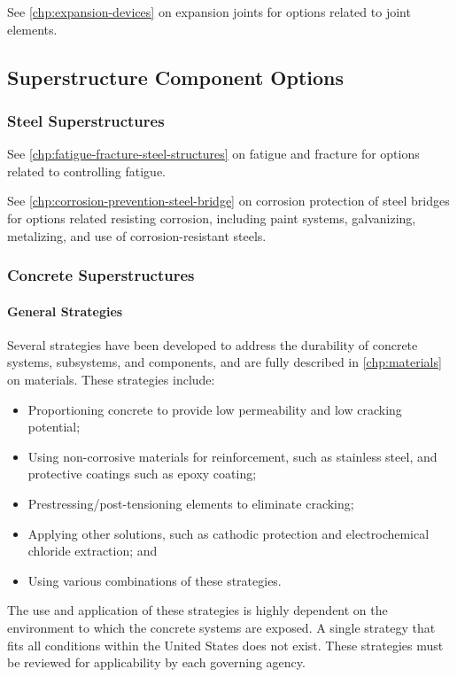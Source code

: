 See \cref{chp:expansion-devices} on expansion joints for options related to joint elements.

\subsection{Superstructure Component Options}
\subsubsection{Steel Superstructures}
See \cref{chp:fatigue-fracture-steel-structures} on fatigue and fracture for options related to controlling fatigue.

See \cref{chp:corrosion-prevention-steel-bridge} on corrosion protection of steel bridges for options related resisting corrosion, including paint systems, galvanizing, metalizing, and use of corrosion-resistant steels.

\subsubsection{Concrete Superstructures}
\paragraph{General Strategies}
Several strategies have been developed to address the durability of concrete systems, subsystems, and
components, and are fully described in \cref{chp:materials} on materials. These strategies include:
\begin{itemize}
  \item Proportioning concrete to provide low permeability and low cracking potential;
  \item Using non-corrosive materials for reinforcement, such as stainless steel, and protective coatings such as
  epoxy coating;
  \item  Prestressing/post-tensioning elements to eliminate cracking;
  \item Applying other solutions, such as cathodic protection and electrochemical chloride extraction; and
  \item Using various combinations of these strategies.
\end{itemize}

The use and application of these strategies is highly dependent on the environment to which the concrete systems
are exposed. A single strategy that fits all conditions within the United States does not exist. These strategies must be
reviewed for applicability by each governing agency.

